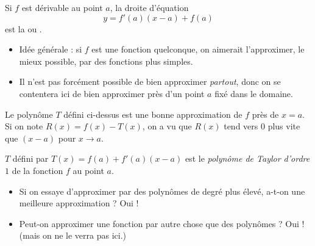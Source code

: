\begin{frame}
  \begin{remark}
  Si $f$ est dérivable au point $a$, la droite d'équation
  \begin{equation*}
    \boxed{y=f'(a)(x-a)+f(a)}
  \end{equation*}
  est la  ou .
\end{remark}
\end{frame}

\begin{frame}
  \begin{remark*}
    \begin{itemize}
    \item Idée générale : si \(f\) est une fonction quelconque, on aimerait l'approximer, le mieux possible, par des fonctions plus simples.\pause{}

    \item Il n'est pas forcément possible de bien approximer \emph{partout},\pause{} donc on se contentera ici de bien approximer près d'un point \(a\) fixé dans le domaine.
    \end{itemize}
  \end{remark*}\pause{}
  
  Le polynôme \(T\) défini ci-dessus est une bonne approximation de \(f\) près de \(x = a\).\pause{} Si on note \(R(x) = f(x) - T(x)\),\pause{} on a vu que \(R(x)\) tend vers \(0\) plus vite que \((x-a)\) pour \(x \to a\).\pause{}
  \begin{definition}
    \(T\) défini par \(T(x) = f(a) + f'(a)(x-a)\) est le \emph{polynôme de Taylor d'ordre \(1\)} de la fonction \(f\) au point \(a\).
  \end{definition}
\end{frame}

\begin{frame}
  \begin{itemize}
  \item Si on essaye d'approximer par des polynômes de degré plus élevé, a-t-on une meilleure approximation ?\pause{} Oui ! \pause{}
  \item Peut-on approximer une fonction par autre chose que des polynômes ? \pause{} Oui !\pause{} (mais on ne le verra pas ici.)
  \end{itemize}
\end{frame}

